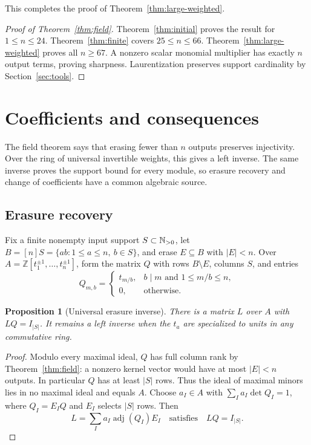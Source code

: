 \documentclass[11pt]{article}
\numberwithin{equation}{section}
\newtheorem{proposition}[theorem]{Proposition}
\theoremstyle{definition}\newtheorem{definition}[theorem]{Definition}
\theoremstyle{remark}\newtheorem{remark}[theorem]{Remark}
\begin{document}
This completes the proof of Theorem~\ref{thm:large-weighted}.

\begin{proof}[Proof of Theorem~\ref{thm:field}]
Theorem~\ref{thm:initial} proves the result for $1\le n\le24$.
Theorem~\ref{thm:finite} covers $25\le n\le66$. Theorem~\ref{thm:large-weighted} proves all
$n\ge67$. A nonzero scalar monomial multiplier has exactly $n$
output terms, proving sharpness. Laurentization preserves support
cardinality by Section~\ref{sec:tools}.
\end{proof}

\section{Coefficients and consequences}\label{sec:modules}

The field theorem says that erasing fewer than $n$ outputs preserves
injectivity. Over the ring of universal invertible weights, this gives
a left inverse. The same inverse proves the support bound for every
module, so erasure recovery and change of coefficients have a common
algebraic source.

\subsection{Erasure recovery}

Fix a finite nonempty input support $S\subset\mathbb N_{>0}$, let
$B=[n]S=\{ab:1\le a\le n,\ b\in S\}$, and erase
$E\subseteq B$ with $|E|<n$.
Over $A=\mathbb Z[t_1^{\pm1},\ldots,t_n^{\pm1}]$, form the
matrix $Q$ with rows $B\setminus E$, columns $S$, and entries
\[
 Q_{m,b}=\begin{cases}
 t_{m/b},&b\mid m\text{ and }1\le m/b\le n,\\
 0,&\text{otherwise}.
 \end{cases}
\]

\begin{proposition}[Universal erasure inverse]\label{prop:universal-inverse}
There is a matrix $L$ over $A$ with $LQ=I_{|S|}$. It remains
a left inverse when the $t_a$ are specialized to units in any
commutative ring.
\end{proposition}
\begin{proof}
Modulo every maximal ideal, $Q$ has full column rank by
Theorem~\ref{thm:field}: a nonzero kernel vector would have at
most $|E|<n$ outputs. In particular $Q$ has at least $|S|$ rows.
Thus the ideal of maximal minors lies
in no maximal ideal and equals $A$.
Choose $a_I\in A$ with $\sum_Ia_I\det Q_I=1$, where
$Q_I=E_IQ$ and $E_I$ selects $|S|$ rows. Then
\[
 L=\sum_Ia_I\operatorname{adj}(Q_I)E_I
 \quad\text{satisfies}\quad LQ=I_{|S|}.
\]
\end{proof}
\end{document}
